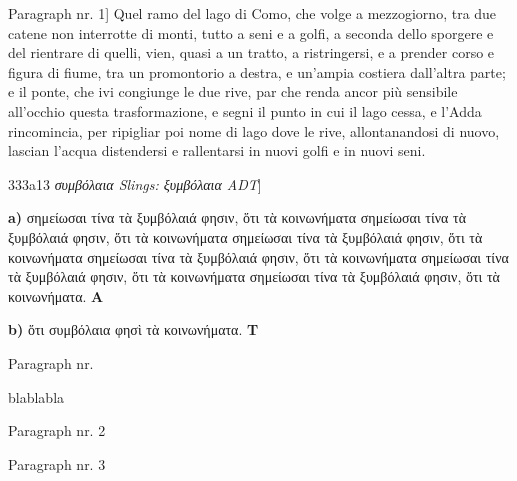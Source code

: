 \documentclass[b5paper]{book}
\begin{document}
\beginnumbering
\numberpstarttrue
\pstart
	Paragraph nr. 1] Quel ramo del lago di Como, che volge a mezzogiorno, tra due catene non interrotte di monti, tutto a seni e a golfi, a seconda dello sporgere e del rientrare di quelli, vien, quasi a un tratto, a ristringersi, e a prender corso e figura di fiume, tra un promontorio a destra, e un'ampia costiera dall'altra parte; e il ponte, che ivi congiunge le due rive, par che renda ancor più sensibile all'occhio questa trasformazione, e segni il punto in cui il lago cessa, e l'Adda rincomincia, per ripigliar poi nome di lago dove le rive, allontanandosi di nuovo, lascian l'acqua distendersi e rallentarsi in nuovi golfi e in nuovi seni.
\pend

\pstart {}333a13 \textit{συμβόλαια Slings: ξυμβόλαια ADT}]\pend

\pausenumbering
\begin{pairs}
\begin{Leftside}
\resumenumbering
\numberpstartfalse
	\pstart\noindent \textbf{a)} σημείωσαι τίνα τὰ ξυμβόλαιά φησιν, ὅτι τὰ κοινωνήματα σημείωσαι τίνα τὰ ξυμβόλαιά φησιν, ὅτι τὰ κοινωνήματα σημείωσαι τίνα τὰ ξυμβόλαιά φησιν, ὅτι τὰ κοινωνήματα σημείωσαι τίνα τὰ ξυμβόλαιά φησιν, ὅτι τὰ κοινωνήματα σημείωσαι τίνα τὰ ξυμβόλαιά φησιν, ὅτι τὰ κοινωνήματα σημείωσαι τίνα τὰ ξυμβόλαιά φησιν, ὅτι τὰ κοινωνήματα. \textbf{A}\pend
\pausenumbering
\end{Leftside}

\begin{Rightside}
\beginnumbering
\numberpstartfalse
	\pstart\noindent{} \textbf{b)} ὅτι συμβόλαια φησὶ τὰ κοινωνήματα. \textbf{T}\pend
\pausenumbering
\end{Rightside}
\end{pairs}
\Columns

\numberpstarttrue
\resumenumbering

\pstart%
	Paragraph nr. %
\pend

\pstart%
	blablabla%
\pend

\pstart{}%
	Paragraph nr. 2%
\pend

\pstart{}%
	Paragraph nr. 3%
\pend
\end{document}
